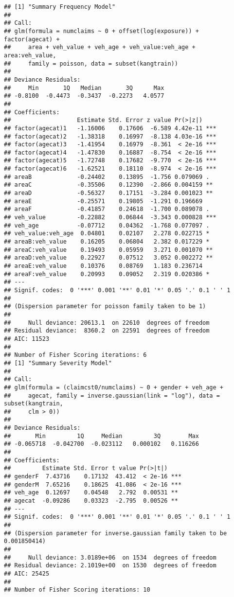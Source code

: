 \documentclass[a4paper]{article}\usepackage[]{graphicx}\usepackage[]{color}
\makeatletter
\newenvironment{kframe}{%
 \def\at@end@of@kframe{}%
 \ifinner\ifhmode%
  \def\at@end@of@kframe{\end{minipage}}%
  \begin{minipage}{\columnwidth}%
 \fi\fi%
 \def\FrameCommand##1{\hskip\@totalleftmargin \hskip-\fboxsep
 \colorbox{shadecolor}{##1}\hskip-\fboxsep
     \hskip-\linewidth \hskip-\@totalleftmargin \hskip\columnwidth}%
 \MakeFramed {\advance\hsize-\width
   \@totalleftmargin\z@ \linewidth\hsize
   \@setminipage}}%
 {\par\unskip\endMakeFramed%
 \at@end@of@kframe}
\newenvironment{knitrout}{}{} %
\makeatother
\begin{document}
\begin{knitrout}
\color{fgcolor}\begin{kframe}
\begin{verbatim}
## [1] "Summary Frequency Model"
## 
## Call:
## glm(formula = numclaims ~ 0 + offset(log(exposure)) + factor(agecat) + 
##     area + veh_value + veh_age + veh_value:veh_age + area:veh_value, 
##     family = poisson, data = subset(kangtrain))
## 
## Deviance Residuals: 
##     Min       1Q   Median       3Q      Max  
## -0.8100  -0.4473  -0.3437  -0.2273   4.0577  
## 
## Coefficients:
##                   Estimate Std. Error z value Pr(>|z|)    
## factor(agecat)1   -1.16006    0.17606  -6.589 4.42e-11 ***
## factor(agecat)2   -1.38318    0.16997  -8.138 4.03e-16 ***
## factor(agecat)3   -1.41954    0.16979  -8.361  < 2e-16 ***
## factor(agecat)4   -1.47830    0.16887  -8.754  < 2e-16 ***
## factor(agecat)5   -1.72748    0.17682  -9.770  < 2e-16 ***
## factor(agecat)6   -1.62521    0.18110  -8.974  < 2e-16 ***
## areaB             -0.24402    0.13895  -1.756 0.079069 .  
## areaC             -0.35506    0.12390  -2.866 0.004159 ** 
## areaD             -0.56327    0.17151  -3.284 0.001023 ** 
## areaE             -0.25571    0.19805  -1.291 0.196669    
## areaF             -0.41857    0.24618  -1.700 0.089078 .  
## veh_value         -0.22882    0.06844  -3.343 0.000828 ***
## veh_age           -0.07712    0.04362  -1.768 0.077097 .  
## veh_value:veh_age  0.04801    0.02107   2.278 0.022715 *  
## areaB:veh_value    0.16205    0.06804   2.382 0.017229 *  
## areaC:veh_value    0.19493    0.05959   3.271 0.001070 ** 
## areaD:veh_value    0.22927    0.07512   3.052 0.002272 ** 
## areaE:veh_value    0.10376    0.08769   1.183 0.236714    
## areaF:veh_value    0.20993    0.09052   2.319 0.020386 *  
## ---
## Signif. codes:  0 '***' 0.001 '**' 0.01 '*' 0.05 '.' 0.1 ' ' 1
## 
## (Dispersion parameter for poisson family taken to be 1)
## 
##     Null deviance: 20613.1  on 22610  degrees of freedom
## Residual deviance:  8360.2  on 22591  degrees of freedom
## AIC: 11523
## 
## Number of Fisher Scoring iterations: 6
## [1] "Summary Severity Model"
## 
## Call:
## glm(formula = (claimcst0/numclaims) ~ 0 + gender + veh_age + 
##     agecat, family = inverse.gaussian(link = "log"), data = subset(kangtrain, 
##     clm > 0))
## 
## Deviance Residuals: 
##       Min         1Q     Median         3Q        Max  
## -0.065718  -0.042700  -0.023112   0.000102   0.116266  
## 
## Coefficients:
##         Estimate Std. Error t value Pr(>|t|)    
## genderF  7.43716    0.17132  43.412  < 2e-16 ***
## genderM  7.65216    0.18625  41.086  < 2e-16 ***
## veh_age  0.12697    0.04548   2.792  0.00531 ** 
## agecat  -0.09286    0.03323  -2.795  0.00526 ** 
## ---
## Signif. codes:  0 '***' 0.001 '**' 0.01 '*' 0.05 '.' 0.1 ' ' 1
## 
## (Dispersion parameter for inverse.gaussian family taken to be 0.001850414)
## 
##     Null deviance: 3.0189e+06  on 1534  degrees of freedom
## Residual deviance: 2.1019e+00  on 1530  degrees of freedom
## AIC: 25425
## 
## Number of Fisher Scoring iterations: 10
\end{verbatim}
\end{kframe}
\end{knitrout}
\end{document}
